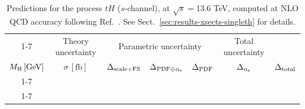 \begin{table}[ht!]
\caption{\label{tab:th-s-top136} Predictions for the process $tH$ ($s$-channel), at $\sqrt{s}=$13.6 TeV, computed at NLO QCD accuracy following Ref.~\cite{Demartin:2015uha}. See Sect.~\ref{sec:results-xsects-singleth} for details.}
\centering
\scriptsize
{\renewcommand{\arraystretch}{1.4}
\begin{tabular}{| cc | c | ccc | c |}
\cline{1-7}
\multicolumn{2}{|c|}{\(\sqrt{s} = 13.6\,\mathrm{TeV}\)} &
\multicolumn{1}{|c|}{Theory uncertainty} &
\multicolumn{3}{|c|}{Parametric uncertainty} &
\multicolumn{1}{c|}{Total uncertainty} \\
\(M_\mathrm{H}\,[\mathrm{GeV}]\) & \(\sigma\,[\mathrm{fb}]\) &
\(\Delta_{\rm scale+\textrm{FS}}\) &
\(\Delta_{{\rm PDF}\oplus\alpha_{\mathrm{s}}}\) &
{\color{black!55}\(\Delta_{\rm PDF}\)} & {\color{black!55}\(\Delta_{\alpha_{\mathrm{s}}}\)} &
\(\Delta_{\rm total}\)
\\
\cline{1-7}
 \\
\cline{1-7}
\end{tabular}
}
\end{table}

